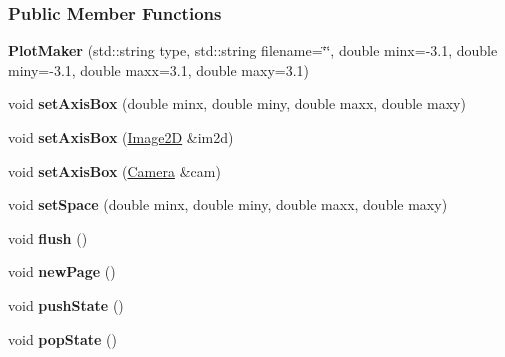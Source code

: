 \subsubsection*{Public Member Functions}
\begin{DoxyCompactItemize}
\item 
\hypertarget{classPlotMaker_ad29eec605eb22329c7b637d565db0834}{
{\bfseries PlotMaker} (std::string type, std::string filename=\char`\"{}\char`\"{}, double minx=-\/3.1, double miny=-\/3.1, double maxx=3.1, double maxy=3.1)}
\label{classPlotMaker_ad29eec605eb22329c7b637d565db0834}

\item 
\hypertarget{classPlotMaker_a27ad38f03afc472ae200ca9cff6bf9c1}{
void {\bfseries setAxisBox} (double minx, double miny, double maxx, double maxy)}
\label{classPlotMaker_a27ad38f03afc472ae200ca9cff6bf9c1}

\item 
\hypertarget{classPlotMaker_ab13a20b6a1bd55ecccf3458cb7c91e9e}{
void {\bfseries setAxisBox} (\hyperlink{classImage2D}{Image2D} \&im2d)}
\label{classPlotMaker_ab13a20b6a1bd55ecccf3458cb7c91e9e}

\item 
\hypertarget{classPlotMaker_ab307012c642e8abfedaa4929999f328d}{
void {\bfseries setAxisBox} (\hyperlink{classCamera}{Camera} \&cam)}
\label{classPlotMaker_ab307012c642e8abfedaa4929999f328d}

\item 
\hypertarget{classPlotMaker_a3a0bd3b9fdd004d19dfeabfd0e0ec4b9}{
void {\bfseries setSpace} (double minx, double miny, double maxx, double maxy)}
\label{classPlotMaker_a3a0bd3b9fdd004d19dfeabfd0e0ec4b9}

\item 
\hypertarget{classPlotMaker_a622cc76bf37733d7b0228b60122afa26}{
void {\bfseries flush} ()}
\label{classPlotMaker_a622cc76bf37733d7b0228b60122afa26}

\item 
\hypertarget{classPlotMaker_a13d5f0523ba4cd8190993643c6e4c6a8}{
void {\bfseries newPage} ()}
\label{classPlotMaker_a13d5f0523ba4cd8190993643c6e4c6a8}

\item 
\hypertarget{classPlotMaker_a7ae7939ed8c5c12f276b431cc861095f}{
void {\bfseries pushState} ()}
\label{classPlotMaker_a7ae7939ed8c5c12f276b431cc861095f}

\item 
\hypertarget{classPlotMaker_a9bec7c4d5b088968228d3f9f1643ed9b}{
void {\bfseries popState} ()}
\label{classPlotMaker_a9bec7c4d5b088968228d3f9f1643ed9b}


\end{DoxyCompactItemize}
